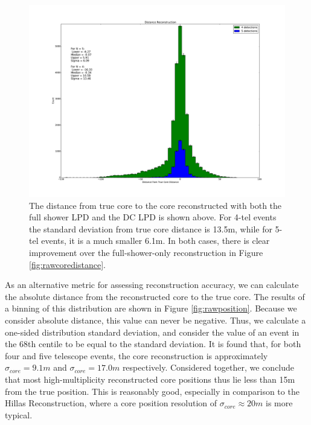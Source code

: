 \documentclass[11pt]{article}
\begin{document}
\begin{figure}
\begin{center}
\includegraphics[width=\textwidth]{coredistance}
\caption{The distance from true core to the core reconstructed with both the full shower LPD and the DC LPD is shown above. For 4-tel events the standard deviation from true core distance is 13.5m, while for 5-tel events, it is a much smaller 6.1m. In both cases, there is clear improvement over the full-shower-only reconstruction in Figure \ref{fig:rawcoredistance}.}
\label{fig:coredistance}
\end{center}
\end{figure}

As an alternative metric for assessing reconstruction accuracy, we can calculate the absolute distance from the reconstructed core to the true core. The results of a binning of this distribution are shown in Figure \ref{fig:rawposition}. Because we consider absolute distance, this value can never be negative. Thus, we calculate a one-sided distribution standard deviation, and consider the value of an event in the 68th centile to be equal to the standard deviation. It is found that, for both four and five telescope events, the core reconstruction is approximately $\sigma_{core} = 9.1m$ and $\sigma_{core}=17.0m$ respectively. Considered together, we conclude that most high-multiplicity reconstructed core positions thus lie less than 15m from the true position. This is reasonably good, especially in comparison to the Hillas Reconstruction, where a core position resolution of $\sigma_{core} \approx 20m$ is more typical.
\end{document}
